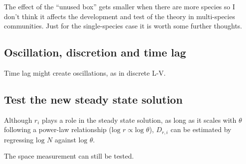 \documentclass[12pt]{article}
\begin{document}
The effect of the ``unused box'' gets smaller when there are more species so I don't think it affects the development and test of the theory in multi-species communities. Just for the single-species case it is worth some further thoughts.

\subsection{Oscillation, discretion and time lag}
Time lag might create oscillations, as in discrete L-V.

\subsection{Test the new steady state solution}

Although $r_i$ plays a role in the steady state solution, as long as it scales with $\theta$ following a power-law relationship ($\mbox{log }r \propto \mbox{log }\theta$), $D_{r,i}$ can be estimated by regressing $\mbox{log }N$ against $\mbox{log }\theta$.

The space measurement can still be tested.
\end{document}
